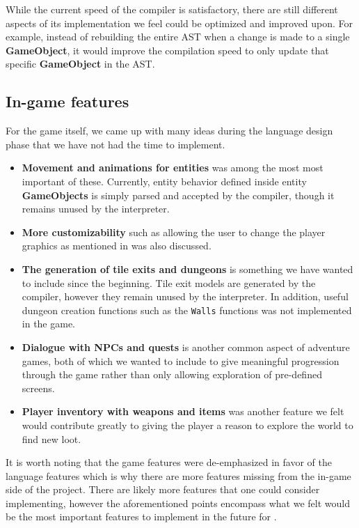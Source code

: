 While the current speed of the compiler is satisfactory, there are still different aspects of its implementation we feel could be optimized and improved upon. 
For example, instead of rebuilding the entire AST when a change is made to a single \textbf{GameObject}, it would improve the compilation speed to only update that specific \textbf{GameObject} in the AST.

\subsection*{In-game features}
For the game itself, we came up with many ideas during the language design phase that we have not had the time to implement. 
\begin{itemize}
  \item
    \textbf{Movement and animations for entities} was among the most most important of these. 
    Currently, entity behavior defined inside entity \textbf{GameObjects} is simply parsed and accepted by the compiler, though it remains unused by the interpreter. 
  \item
      \textbf{More customizability} such as allowing the user to change the player graphics as mentioned in  was also discussed.
  \item 
    \textbf{The generation of tile exits and dungeons} is something we have wanted to include since the beginning. Tile exit models are generated by the compiler, however they remain unused by the interpreter. In addition, useful dungeon creation functions such as the \texttt{Walls} functions was not implemented in the game.
  \item
    \textbf{Dialogue with NPCs and quests} is another common aspect of adventure games, both of which we wanted to include to give meaningful progression through the game rather than only allowing exploration of pre-defined screens. 
  \item 
    \textbf{Player inventory with weapons and items} was another feature we felt would contribute greatly to giving the player a reason to explore the world to find new loot.
\end{itemize}

It is worth noting that the game features were de-emphasized in favor of the language features which is why there are more features missing from the in-game side of the project. There are likely more features that one could consider implementing, however the aforementioned points encompass what we felt would be the most important features to implement in the future for \dazel{}.